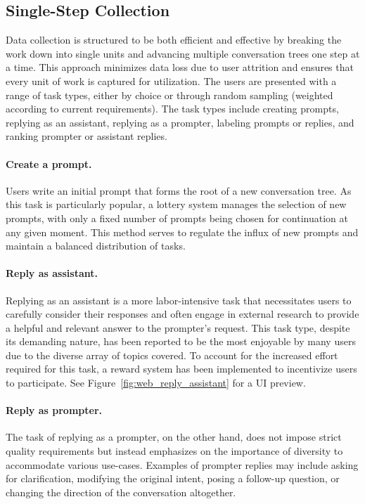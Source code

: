 \subsection{Single-Step Collection}\label{sec:single-state-collection}

Data collection is structured to be both efficient and effective by breaking the work down into single units and advancing multiple conversation trees one step at a time. This approach minimizes data loss due to user attrition and ensures that every unit of work is captured for utilization. The users are presented with a range of task types, either by choice or through random sampling (weighted according to current requirements). The task types include creating prompts, replying as an assistant, replying as a prompter, labeling prompts or replies, and ranking prompter or assistant replies.

\paragraph{Create a prompt.} Users write an initial prompt that forms the root of a new conversation tree. As this task is particularly popular, a lottery system manages the selection of new prompts, with only a fixed number of prompts being chosen for continuation at any given moment. This method serves to regulate the influx of new prompts and maintain a balanced distribution of tasks.

\paragraph{Reply as assistant.}Replying as an assistant is a more labor-intensive task that necessitates users to carefully consider their responses and often engage in external research to provide a helpful and relevant answer to the prompter's request. This task type, despite its demanding nature, has been reported to be the most enjoyable by many users due to the diverse array of topics covered. To account for the increased effort required for this task, a reward system has been implemented to incentivize users to participate. See Figure~\ref{fig:web_reply_assistant} for a UI preview.

\paragraph{Reply as prompter.}The task of replying as a prompter, on the other hand, does not impose strict quality requirements but instead emphasizes on the importance of diversity to accommodate various use-cases. Examples of prompter replies may include asking for clarification, modifying the original intent, posing a follow-up question, or changing the direction of the conversation altogether.

